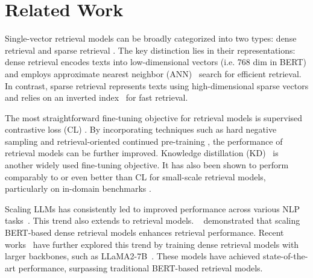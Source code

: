 \section{Related Work}
Single-vector retrieval models can be broadly categorized into two types: dense retrieval \cite{ance,dpr,cl-drd,rocketqav2,margin-mse,tas-b,repllama,llama2vec,echo-embed} and sparse retrieval \cite{splade,splade-mistral,splade-v2,snrm,spade}. The key distinction lies in their representations: dense retrieval encodes texts into low-dimensional vectors (i.e. 768 dim in BERT) and employs approximate nearest neighbor (ANN)~\cite{ance,faiss-gpu} search for efficient retrieval. In contrast, sparse retrieval represents texts using high-dimensional sparse vectors and relies on an inverted index~\cite{spade,inverted-index} for fast retrieval. 
 
The most straightforward fine-tuning objective for retrieval models is supervised contrastive loss (CL) \cite{repllama,co-condenser}. By incorporating techniques such as hard negative sampling \cite{ance,adore} and retrieval-oriented continued pre-training \cite{b-prop,co-condenser}, the performance of retrieval models can be further improved. 
Knowledge distillation (KD)~\cite{colbertv2,rocketqav2,cl-drd,tas-b,margin-mse,tct-colbert,kd} is another widely used fine-tuning objective. 
It has also been shown to perform comparably to or even better than CL for small-scale retrieval models, particularly on in-domain benchmarks \cite{tas-b,cl-drd}.

Scaling LLMs has consistently led to improved performance across various NLP tasks~\cite{gpt-3,chinchilla,mt-scaling-1,mt-scaling-2,emergent-llm}. This trend also extends to retrieval models. ~\citet{scale-dr} demonstrated that scaling BERT-based dense retrieval models enhances retrieval performance.
Recent works~\cite{llama2vec,echo-embed,splade-mistral,llm2vec} have further explored this trend by training dense retrieval models with larger backbones, such as LLaMA2-7B~\cite{llama2}. These models have achieved state-of-the-art performance, surpassing traditional BERT-based retrieval models.
\vspace{-.25cm}